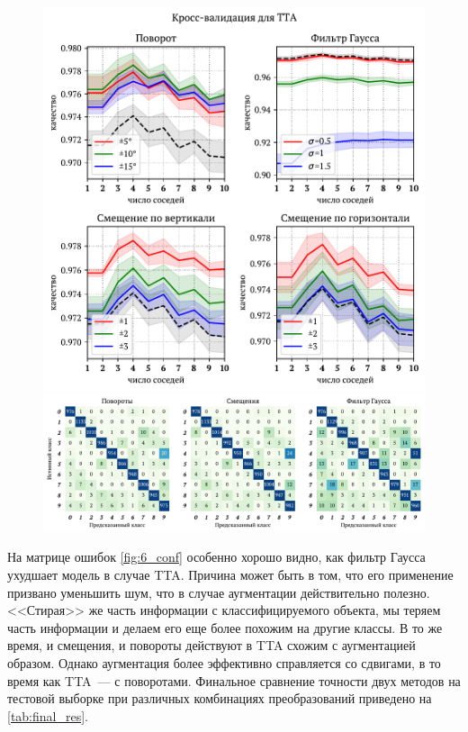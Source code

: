 \documentclass[12pt]{article}
\begin{document}
\begin{figure}[!h]
    \includegraphics{6_cv}
    \caption{}
    \label{fig:6_cv}
    \includegraphics[width=\textwidth]{6_conf}
    \caption{}
    \label{fig:6_conf}
\end{figure}

 На матрице ошибок \autoref{fig:6_conf} особенно хорошо видно, как фильтр Гаусса ухудшает модель в случае TTA. Причина может быть в том, что его применение призвано уменьшить шум, что в случае аугментации действительно полезно. <<Стирая>> же часть информации с классифицируемого объекта, мы теряем часть информации и делаем его еще более похожим на другие классы. В то же время, и смещения, и повороты действуют в TTA схожим с аугментацией образом. Однако аугментация более эффективно справляется со сдвигами, в то время как TTA~--- с поворотами. Финальное сравнение точности двух методов на тестовой выборке при различных комбинациях преобразований приведено на \autoref{tab:final_res}.
\end{document}
